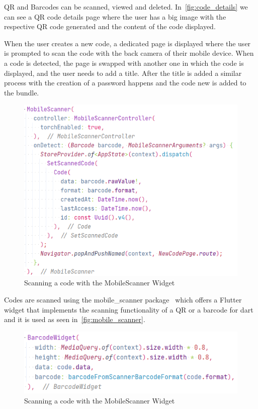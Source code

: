 \documentclass[a4paper,12pt]{report}
\begin{document}
QR and Barcodes can be scanned, viewed and deleted.
In~\autoref{fig:code_details} we can see a QR code details page where the user
has a big image with the respective QR code generated and the content of the
code displayed.

When the user creates a new code, a dedicated page is displayed where the user
is prompted to scan the code with the back camera of their mobile device. When
a code is detected, the page is swapped with another one in which the code is
displayed, and the user needs to add a title. After the title is added a
similar process with the creation of a password happens and the code new is
added to the bundle.

\begin{figure}[H]
    \centering
    \includegraphics[scale=0.6]{images/code/mobile_scanner.png}
    \caption{Scanning a code with the MobileScanner Widget}\label{fig:mobile_scanner}
\end{figure}

Codes are scanned using the mobile\_scanner package~\cite{mobileScannerDocs}
which offers a Flutter widget that implements the scanning functionality of a
QR or a barcode for dart and it is used as seen
in~\autoref{fig:mobile_scanner}.

\begin{figure}[H]
    \centering
    \includegraphics[scale=0.6]{images/code/barcode_widget.png}
    \caption{Scanning a code with the MobileScanner Widget}\label{fig:barcode_widget}
\end{figure}
\end{document}
